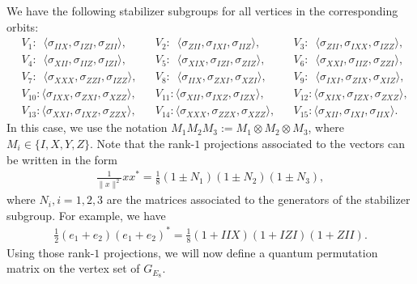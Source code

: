 \documentclass[11pt]{article}
\theoremstyle{definition}
\numberwithin{equation}{section}
\begin{document}
We have the following stabilizer subgroups for all vertices in the corresponding orbits:
\begin{align} \label{Stabs}
    &V_1:\,\,\, \langle \sigma_{IIX}, \sigma_{IZI}, \sigma_{ZII}\rangle, &&V_2:\,\,\,\langle \sigma_{ZII}, \sigma_{IXI}, \sigma_{IIZ}\rangle, &&V_3:\,\,\,\langle \sigma_{ZII}, \sigma_{IXX}, \sigma_{IZZ}\rangle,\\
    &V_4:\,\,\,\langle \sigma_{XII}, \sigma_{IIZ}, \sigma_{IZI}\rangle, &&V_5:\,\,\,\langle \sigma_{XIX}, \sigma_{IZI}, \sigma_{ZIZ}\rangle, &&V_6:\,\,\,\langle \sigma_{XXI}, \sigma_{IIZ}, \sigma_{ZZI}\rangle,\nonumber\\
    &V_7:\,\,\,\langle \sigma_{XXX}, \sigma_{ZZI}, \sigma_{IZZ}\rangle, &&V_8:\,\,\,\langle \sigma_{IIX}, \sigma_{ZXI}, \sigma_{XZI}\rangle, &&V_9:\,\,\,\langle \sigma_{IXI}, \sigma_{ZIX}, \sigma_{XIZ}\rangle,\nonumber\\
    &V_{10}:\langle \sigma_{IXX}, \sigma_{ZXI}, \sigma_{XZZ}\rangle, &&V_{11}:\langle \sigma_{XII}, \sigma_{IXZ}, \sigma_{IZX}\rangle, &&V_{12}:\langle \sigma_{XIX}, \sigma_{IZX}, \sigma_{ZXZ}\rangle,\nonumber\\
    &V_{13}:\langle \sigma_{XXI}, \sigma_{IXZ}, \sigma_{ZZX}\rangle, &&V_{14}:\langle \sigma_{XXX}, \sigma_{ZZX}, \sigma_{XZZ}\rangle, &&V_{15}:\langle \sigma_{XII}, \sigma_{IXI}, \sigma_{IIX}\rangle.\nonumber
\end{align}
In this case, we use the notation $M_1M_2M_3:=M_1 \otimes M_2 \otimes M_3$, where $M_i\in \{I,X,Y,Z\}$.
Note that the rank-$1$ projections associated to the vectors can be written in the form 
\begin{align*}
    \frac{1}{\|x\|^2}xx^*=\frac{1}{8}(1\pm N_1)(1\pm N_2)(1\pm N_3),
\end{align*}
where $N_i, i=1,2,3$ are the matrices associated to the generators of the stabilizer subgroup. For example, we have
\begin{align*}
    \frac{1}{2}(e_1+e_2)(e_1+e_2)^*=\frac{1}{8}(1+IIX)(1+IZI)(1+ZII).
\end{align*}
Using those rank-$1$ projections, we will now define a quantum permutation matrix on the vertex set of $G_{E_8}$. 
\end{document}
